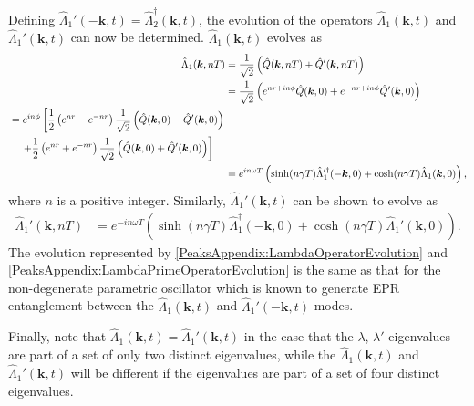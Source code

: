 Defining $\hat{\Lambda}_1'(-\bm{k}, t) = \hat{\Lambda}_2^\dagger(\bm{k}, t)$, the evolution of the operators $\hat{\Lambda}_1(\bm{k}, t)$ and $\hat{\Lambda}_1'(\bm{k}, t)$ can now be determined. $\hat{\Lambda}_1(\bm{k}, t)$ evolves as
\begin{align}
    \hat{\Lambda}_1(\bm{k}, nT) &= \frac{1}{\sqrt{2}} \left(\hat{Q}(\bm{k}, nT) + \hat{Q}'(\bm{k}, nT) \right) \\
        &= \frac{1}{\sqrt{2}} \left( e^{nr + i n\phi} \hat{Q}(\bm{k}, 0) + e^{-nr + i n \phi}\hat{Q}'(\bm{k}, 0)\right) \\
        \begin{split}
            &=  e^{i n \phi} \left[ \frac{1}{2}\left( e^{nr} - e^{-nr}\right)\frac{1}{\sqrt{2}}\left(\hat{Q}(\bm{k}, 0) - \hat{Q}'(\bm{k}, 0) \right) \right.\\
            &\relphantom{=}\left. + \frac{1}{2} \left( e^{nr} + e^{-nr}\right)\frac{1}{\sqrt{2}} \left( \hat{Q}(\bm{k}, 0) + \hat{Q}'(\bm{k}, 0)\right)\right]
        \end{split}\\
        &= e^{i n \omega T} \left( \sinh(n\gamma T) \hat{\Lambda}_1'^\dagger(-\bm{k}, 0) + \cosh(n \gamma T) \hat{\Lambda}_1(\bm{k}, 0)\right), \label{PeaksAppendix:LambdaOperatorEvolution}
\end{align}
where $n$ is a positive integer. Similarly, $\hat{\Lambda}_1'(\bm{k}, t)$ can be shown to evolve as
\begin{align}
    \hat{\Lambda}_1'(\bm{k}, nT) &= e^{-i n \omega T} \left( \sinh(n \gamma T) \hat{\Lambda}_1^\dagger(-\bm{k}, 0) + \cosh(n \gamma T) \hat{\Lambda}_1'(\bm{k}, 0)\right). \label{PeaksAppendix:LambdaPrimeOperatorEvolution}
\end{align}
The evolution represented by \eqref{PeaksAppendix:LambdaOperatorEvolution} and \eqref{PeaksAppendix:LambdaPrimeOperatorEvolution} is the same as that for the non-degenerate parametric oscillator \citep{WallsMilburn} which is known to generate EPR entanglement between the $\hat{\Lambda}_1(\bm{k}, t)$ and $\hat{\Lambda}_1'(-\bm{k}, t)$ modes.

Finally, note that $\hat{\Lambda}_1(\bm{k}, t) = \hat{\Lambda}_1'(\bm{k}, t)$ in the case that the $\lambda$, $\lambda'$ eigenvalues are part of a set of only two distinct eigenvalues, while the $\hat{\Lambda}_1(\bm{k}, t)$ and $\hat{\Lambda}_1'(\bm{k}, t)$ will be different if the eigenvalues are part of a set of four distinct eigenvalues.
